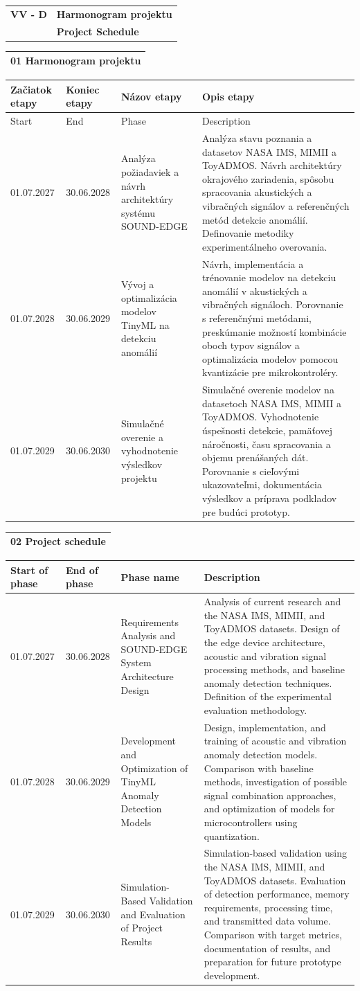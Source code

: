 \documentclass[9pt,a4paper]{extarticle}
\newcommand{\SecHead}[3]{\par\needspace{45pt}\vspace{7pt}\noindent
\begin{tabularx}{\textwidth}{|>{\bfseries\centering\arraybackslash}p{18mm}|X|}
\hline\cellcolor{shade}#1 & \cellcolor{shade}\hfill\bfseries #2 \\ \cellcolor{shade} & \cellcolor{shade}\hfill\bfseries #3 \\ \hline
\end{tabularx}\vspace{3pt}\par}
\newcommand{\SectionTitle}[1]{\vspace{4pt}\noindent\begin{tabularx}{\textwidth}{|>{\columncolor{shade}}X|}\hline\bfseries #1 \\ \hline\end{tabularx}\vspace{-2pt}}
\begin{document}
\SecHead{VV - D}{Harmonogram projektu}{Project Schedule}
\SectionTitle{01 Harmonogram projektu}
\begin{longtable}{|p{20mm}|p{20mm}|p{51mm}|p{74mm}|}\hline
\rowcolor{shade} Začiatok etapy & Koniec etapy & Názov etapy & Opis etapy\\\hline\endfirsthead
\hline\rowcolor{shade} Start & End & Phase & Description\\\hline\endhead
01.07.2027 & 30.06.2028 & Analýza požiadaviek a návrh architektúry systému SOUND-EDGE & Analýza stavu poznania a datasetov NASA IMS, MIMII a ToyADMOS. Návrh architektúry okrajového zariadenia, spôsobu spracovania akustických a vibračných signálov a referenčných metód detekcie anomálií. Definovanie metodiky experimentálneho overovania.\\\hline
01.07.2028 & 30.06.2029 & Vývoj a optimalizácia modelov TinyML na detekciu anomálií & Návrh, implementácia a trénovanie modelov na detekciu anomálií v akustických a vibračných signáloch. Porovnanie s referenčnými metódami, preskúmanie možností kombinácie oboch typov signálov a optimalizácia modelov pomocou kvantizácie pre mikrokontroléry.\\\hline
01.07.2029 & 30.06.2030 & Simulačné overenie a vyhodnotenie výsledkov projektu & Simulačné overenie modelov na datasetoch NASA IMS, MIMII a ToyADMOS. Vyhodnotenie úspešnosti detekcie, pamäťovej náročnosti, času spracovania a objemu prenášaných dát. Porovnanie s cieľovými ukazovateľmi, dokumentácia výsledkov a príprava podkladov pre budúci prototyp.\\\hline
\end{longtable}
\SectionTitle{02 Project schedule}
\begin{longtable}{|p{20mm}|p{20mm}|p{51mm}|p{74mm}|}\hline
\rowcolor{shade} Start of phase & End of phase & Phase name & Description\\\hline\endhead
01.07.2027 & 30.06.2028 & Requirements Analysis and SOUND-EDGE System Architecture Design & Analysis of current research and the NASA IMS, MIMII, and ToyADMOS datasets. Design of the edge device architecture, acoustic and vibration signal processing methods, and baseline anomaly detection techniques. Definition of the experimental evaluation methodology.\\\hline
01.07.2028 & 30.06.2029 & Development and Optimization of TinyML Anomaly Detection Models & Design, implementation, and training of acoustic and vibration anomaly detection models. Comparison with baseline methods, investigation of possible signal combination approaches, and optimization of models for microcontrollers using quantization.\\\hline
01.07.2029 & 30.06.2030 & Simulation-Based Validation and Evaluation of Project Results & Simulation-based validation using the NASA IMS, MIMII, and ToyADMOS datasets. Evaluation of detection performance, memory requirements, processing time, and transmitted data volume. Comparison with target metrics, documentation of results, and preparation for future prototype development.\\\hline
\end{longtable}
\clearpage
\end{document}
